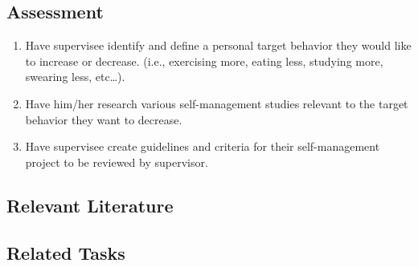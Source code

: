 \subsection{Assessment}
\begin{enumerate}
\item Have supervisee identify and define a personal target behavior they would like to increase or decrease. (i.e., exercising more, eating less, studying more, swearing less, etc…). 
\item Have him/her research various self-management studies relevant to the target behavior they want to decrease. 
\item Have supervisee create guidelines and criteria for their self-management project to be reviewed by supervisor. 
\end{enumerate}
%
\subsection{Relevant Literature}
\begin{refsection}
\nocite{test,alang2017police,clayton2018black}
\printbibliography[heading=none]
\end{refsection}
%
\subsection{Related Tasks}
\fourbThree{}\\ 
\fourfTwo{}\\
\fouriOne{}\\
\fouriSix{}\\
\fourjOne{}\\
\fourjTwo{}\\
\fourjTen{}\\
\fourFKEighteen{}\\
\fourFKTwenty{}\\
\fourFKThirtyOne{}\\
%
%
%
%
%
%
%
%
